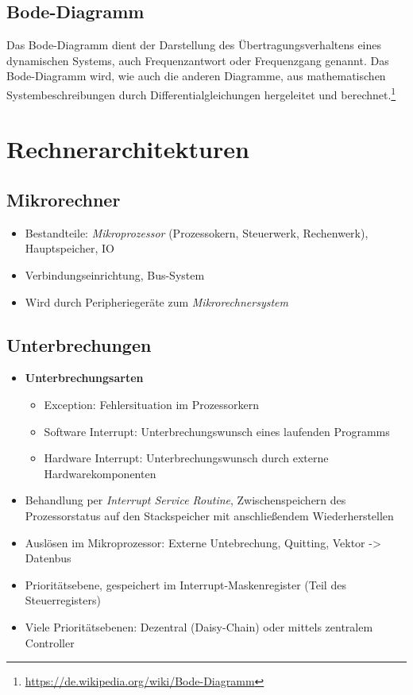 \subsection{Bode-Diagramm}
Das Bode-Diagramm dient der Darstellung des Übertragungsverhaltens eines dynamischen Systems, auch Frequenzantwort oder Frequenzgang genannt.
Das Bode-Diagramm wird, wie auch die anderen Diagramme, aus mathematischen Systembeschreibungen durch Differentialgleichungen hergeleitet und berechnet.\footnote{\url{https://de.wikipedia.org/wiki/Bode-Diagramm}}



\section{Rechnerarchitekturen}

\subsection{Mikrorechner}
\begin{itemize}
	\item Bestandteile: \textit{Mikroprozessor} (Prozessokern, Steuerwerk, Rechenwerk), Hauptspeicher, IO
	\item Verbindungseinrichtung, Bus-System
	\item Wird durch Peripheriegeräte zum \textit{Mikrorechnersystem}
\end{itemize}


\subsection{Unterbrechungen}
\begin{itemize}
	\item \textbf{Unterbrechungsarten}
	\begin{itemize}
		\item Exception: Fehlersituation im Prozessorkern
		\item Software Interrupt: Unterbrechungswunsch eines laufenden Programms
		\item Hardware Interrupt: Unterbrechungswunsch durch externe Hardwarekomponenten
	\end{itemize}
	\item Behandlung per \textit{Interrupt Service Routine}, Zwischenspeichern des Prozessorstatus auf den Stackspeicher mit anschließendem Wiederherstellen
	\item Auslösen im Mikroprozessor: Externe Untebrechung, Quitting, Vektor -> Datenbus
	\item Prioritätsebene, gespeichert im Interrupt-Maskenregister (Teil des Steuerregisters)
	\item Viele Prioritätsebenen: Dezentral (Daisy-Chain) oder mittels zentralem Controller
\end{itemize}


